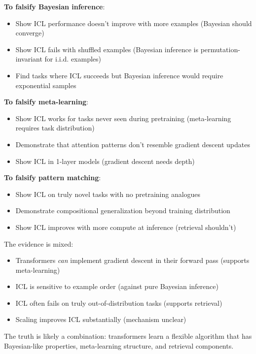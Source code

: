 \begin{remark}
    \textbf{To falsify Bayesian inference}:
    \begin{itemize}
        \item Show ICL performance doesn't improve with more examples (Bayesian should converge)
        \item Show ICL fails with shuffled examples (Bayesian inference is permutation-invariant for i.i.d. examples)
        \item Find tasks where ICL succeeds but Bayesian inference would require exponential samples
    \end{itemize}

    \textbf{To falsify meta-learning}:
    \begin{itemize}
        \item Show ICL works for tasks never seen during pretraining (meta-learning requires task distribution)
        \item Demonstrate that attention patterns don't resemble gradient descent updates
        \item Show ICL in 1-layer models (gradient descent needs depth)
    \end{itemize}

    \textbf{To falsify pattern matching}:
    \begin{itemize}
        \item Show ICL on truly novel tasks with no pretraining analogues
        \item Demonstrate compositional generalization beyond training distribution
        \item Show ICL improves with more compute at inference (retrieval shouldn't)
    \end{itemize}
\end{remark}

\begin{remark}
    The evidence is mixed:
    \begin{itemize}
        \item Transformers \emph{can} implement gradient descent in their forward pass (supports meta-learning)
        \item ICL is sensitive to example order (against pure Bayesian inference)
        \item ICL often fails on truly out-of-distribution tasks (supports retrieval)
        \item Scaling improves ICL substantially (mechanism unclear)
    \end{itemize}

    The truth is likely a combination: transformers learn a flexible algorithm that has Bayesian-like properties, meta-learning structure, and retrieval components.
\end{remark}

